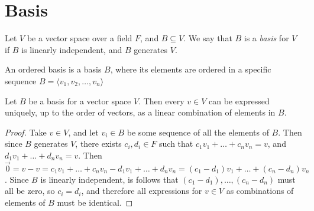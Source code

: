 \section{Basis}

\begin{defn}
    Let $V$ be a vector space over a field $F$, and $B \subseteq V$. We say that $B$ is a \emph{basis} for $V$ if $B$ is linearly independent, and $B$ generates $V$.
\end{defn}

\begin{defn}
    An ordered basis is a basis $B$, where its elements are ordered in a specific sequence $B = \langle v_1, v_2, \ldots, v_n \rangle$
\end{defn}

\begin{prop}\label{unique-basis-expression}
    Let $B$ be a basis for a vector space $V$. Then every $v \in V$ can be expressed uniquely, up to the order of vectors, as a linear combination of elements in $B$.
\end{prop}

\begin{proof}
    Take $v \in V$, and let $v_i \in B$ be some sequence of all the elements of $B$. Then since $B$ generates $V$, there exists $c_i, d_i \in F$ such that $c_1v_1 + \ldots + c_nv_n = v$, and $d_1v_1 + \ldots + d_nv_n = v$. Then $\vec{0} = v - v = c_1v_1 + \ldots + c_nv_n - d_1v_1 + \ldots + d_nv_n = (c_1 - d_1)v_1 + \ldots + (c_n - d_n)v_n$. Since $B$ is linearly independent, is follows that $(c_1 - d_1), \ldots, (c_n - d_n)$ must all be zero, so $c_i = d_i$, and therefore all expressions for $v \in V$ as combinations of elements of $B$ must be identical.
\end{proof}


